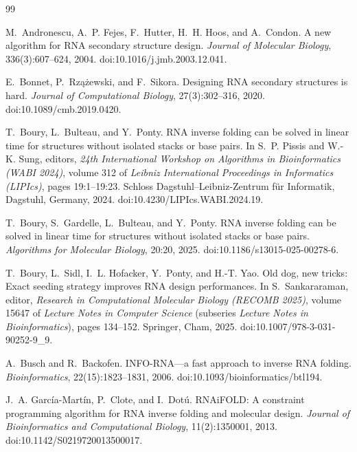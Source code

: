\documentclass[11pt]{article}
\begin{document}
\small
\begin{thebibliography}{99}

M.~Andronescu, A.~P. Fejes, F.~Hutter, H.~H. Hoos, and A.~Condon.
\newblock A new algorithm for RNA secondary structure design.
\newblock \emph{Journal of Molecular Biology}, 336(3):607--624, 2004.
\newblock doi:10.1016/j.jmb.2003.12.041.

E.~Bonnet, P.~Rz\k{a}\.{z}ewski, and F.~Sikora.
\newblock Designing RNA secondary structures is hard.
\newblock \emph{Journal of Computational Biology}, 27(3):302--316, 2020.
\newblock doi:10.1089/cmb.2019.0420.

T.~Boury, L.~Bulteau, and Y.~Ponty.
\newblock RNA inverse folding can be solved in linear time for structures
  without isolated stacks or base pairs.
\newblock In S.~P. Pissis and W.-K. Sung, editors, \emph{24th International
  Workshop on Algorithms in Bioinformatics (WABI 2024)}, volume 312 of
  \emph{Leibniz International Proceedings in Informatics (LIPIcs)},
  pages 19:1--19:23. Schloss Dagstuhl--Leibniz-Zentrum f\"ur Informatik,
  Dagstuhl, Germany, 2024.
\newblock doi:10.4230/LIPIcs.WABI.2024.19.

T.~Boury, S.~Gardelle, L.~Bulteau, and Y.~Ponty.
\newblock RNA inverse folding can be solved in linear time for structures
  without isolated stacks or base pairs.
\newblock \emph{Algorithms for Molecular Biology}, 20:20, 2025.
\newblock doi:10.1186/s13015-025-00278-6.

T.~Boury, L.~Sidl, I.~L. Hofacker, Y.~Ponty, and H.-T. Yao.
\newblock Old dog, new tricks: Exact seeding strategy improves RNA design
  performances.
\newblock In S.~Sankararaman, editor, \emph{Research in Computational
  Molecular Biology (RECOMB 2025)}, volume 15647 of
  \emph{Lecture Notes in Computer Science} (subseries \emph{Lecture Notes
  in Bioinformatics}), pages 134--152.
  Springer, Cham, 2025.
\newblock doi:10.1007/978-3-031-90252-9\_9.

A.~Busch and R.~Backofen.
\newblock INFO-RNA---a fast approach to inverse RNA folding.
\newblock \emph{Bioinformatics}, 22(15):1823--1831, 2006.
\newblock doi:10.1093/bioinformatics/btl194.

J.~A. Garc\'ia-Mart\'in, P.~Clote, and I.~Dot\'u.
\newblock RNAiFOLD: A constraint programming algorithm for RNA inverse
  folding and molecular design.
\newblock \emph{Journal of Bioinformatics and Computational Biology},
  11(2):1350001, 2013.
\newblock doi:10.1142/S0219720013500017.


\end{thebibliography}
\end{document}
